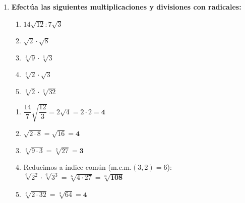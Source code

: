 \documentclass[a4paper,12pt]{article}
\begin{document}
\begin{enumerate}
    \item \textbf{Efectúa las siguientes multiplicaciones y divisiones con radicales:}
        \begin{enumerate}[label=\alph*)]
            \item $14\sqrt{12} : 7\sqrt{3}$
            \item $\sqrt{2} \cdot \sqrt{8}$
            \item $\sqrt[3]{9} \cdot \sqrt[3]{3}$
            \item $\sqrt[3]{2} \cdot \sqrt{3}$
            \item $\sqrt[3]{2} \cdot \sqrt[3]{32}$
        \end{enumerate}
        \begin{solucion}
            \begin{enumerate}[label=\alph*)]
                \item $\dfrac{14}{7}\sqrt{\dfrac{12}{3}} = 2\sqrt{4} = 2 \cdot 2 = \mathbf{4}$
                \item $\sqrt{2 \cdot 8} = \sqrt{16} = \mathbf{4}$
                \item $\sqrt[3]{9 \cdot 3} = \sqrt[3]{27} = \mathbf{3}$
                \item Reducimos a índice común ($\text{m.c.m.}(3,2) = 6$): $\sqrt[6]{2^{2}} \cdot \sqrt[6]{3^{3}} = \sqrt[6]{4 \cdot 27} = \mathbf{\sqrt[6]{108}}$
                \item $\sqrt[3]{2 \cdot 32} = \sqrt[3]{64} = \mathbf{4}$
            \end{enumerate}
        \end{solucion}


\end{enumerate}
\end{document}
